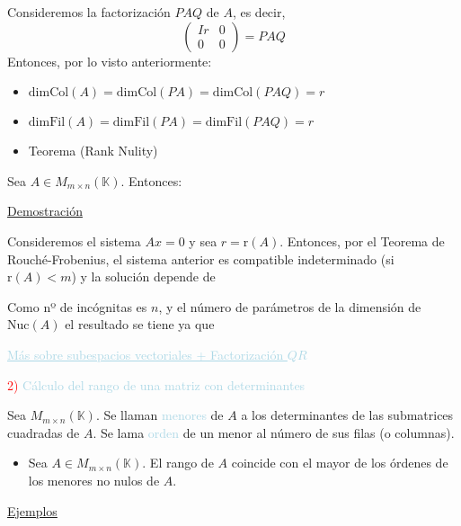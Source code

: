 \documentclass[12pt]{article}
\begin{document}
Consideremos la factorización $PAQ$ de $A$, es decir, \[\left(\begin{array}{c|c}
Ir & 0 \\ \hline
0 & 0
\end{array} \right)=PAQ\]
Entonces, por lo visto anteriormente:
\begin{itemize}
\item[] $\mathrm{dimCol}(A)=\mathrm{dimCol}(PA)=\mathrm{dimCol}(PAQ)=r$
\item[] $\mathrm{dimFil}(A)=\mathrm{dimFil}(PA)=\mathrm{dimFil}(PAQ)=r$
\end{itemize}
\begin{itemize}[label=\color{red}\textbullet, leftmargin=*]
    \item \color{lightblue}Teorema (Rank Nulity)
\end{itemize}
Sea $A\in M_{m\times n}(\mathbb{K})$. Entonces: \begin{center}
\end{center}
\underline{Demostración}

Consideremos el sistema $Ax=0$ y sea $r=\mathrm{r}(A)$. Entonces, por el Teorema de Rouché-Frobenius, el sistema anterior es compatible indeterminado (si $\mathrm{r}(A)<m$) y la solución depende de \begin{center}
\end{center}
Como nº de incógnitas es $n$, y el número de parámetros de la dimensión de $\mathrm{Nuc}(A)$ el resultado se tiene ya que \begin{center}
\end{center}
\textcolor{lightblue}{\underline{Más sobre subespacios vectoriales + Factorización $QR$}}

\textcolor{red}{2) }\textcolor{lightblue}{Cálculo del rango de una matriz con determinantes}

Sea $M_{m\times n}(\mathbb{K})$. Se llaman \textcolor{lightblue}{menores} de $A$ a los determinantes de las submatrices cuadradas de $A$. Se lama \textcolor{lightblue}{orden} de un menor al número de sus filas (o columnas).
\begin{itemize}[label=\color{red}\textbullet, leftmargin=*]
    \item \color{lightblue} Sea $A\in M_{m\times n}(\mathbb{K})$. El rango de $A$ coincide con el mayor de los órdenes de los menores no nulos de $A$.
\end{itemize}
\underline{Ejemplos}
\end{document}
